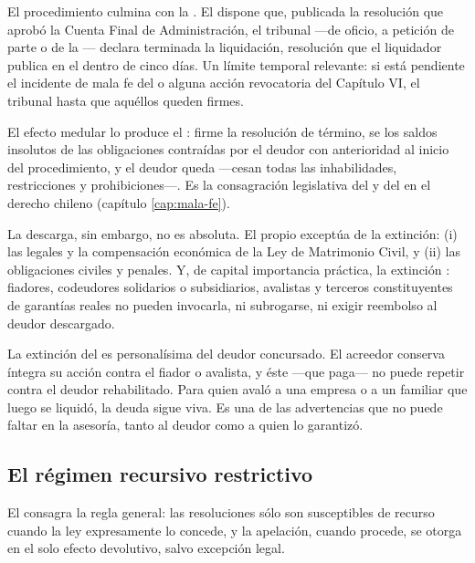 El procedimiento culmina con la . El  dispone que,
publicada la resolución que aprobó la Cuenta Final de Administración, el tribunal ---de oficio, a
petición de parte o de la \superir{}--- declara terminada la liquidación, resolución que el
liquidador publica en el \boletin{} dentro de cinco días. Un límite temporal relevante: si está
pendiente el incidente de mala fe del  o alguna acción revocatoria del Capítulo VI, el
tribunal  hasta que aquéllos queden firmes.

El efecto medular lo produce el : firme la resolución de término, se  los saldos insolutos de las obligaciones contraídas por el deudor
con anterioridad al inicio del procedimiento, y el deudor queda  ---cesan
todas las inhabilidades, restricciones y prohibiciones---. Es la consagración legislativa del
\discharge{} y del \freshstart{} en el derecho chileno (capítulo \ref{cap:mala-fe}).

La descarga, sin embargo, no es absoluta. El propio  exceptúa de la extinción: (i) las
 legales y la compensación económica de la Ley de Matrimonio Civil, y
(ii) las obligaciones  civiles y penales. Y, de
capital importancia práctica, la extinción : fiadores,
codeudores solidarios o subsidiarios, avalistas y terceros constituyentes de garantías reales no
pueden invocarla, ni subrogarse, ni exigir reembolso al deudor descargado.

\begin{alerta}
La extinción del  es personalísima del deudor concursado. El acreedor conserva íntegra su
acción contra el fiador o avalista, y éste ---que paga--- no puede repetir contra el deudor
rehabilitado. Para quien avaló a una empresa o a un familiar que luego se liquidó, la deuda sigue
viva. Es una de las advertencias que no puede faltar en la asesoría, tanto al deudor como a quien
lo garantizó.
\end{alerta}

\subsection{El régimen recursivo restrictivo}

El  consagra la regla general: las resoluciones sólo son susceptibles de recurso
cuando la ley expresamente lo concede, y la apelación, cuando procede, se otorga en el solo
efecto devolutivo, salvo excepción legal.

